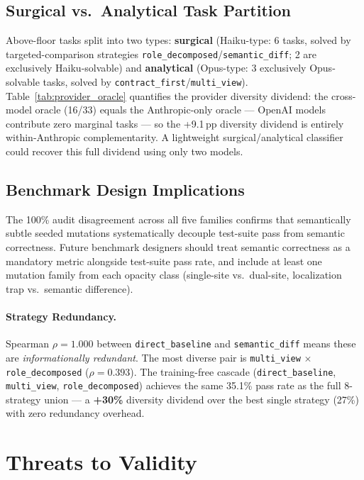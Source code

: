 \documentclass[sigconf,review,anonymous]{acmart}
\newcommand{\pp}{\,pp}
\begin{document}
\subsection{Surgical vs.\ Analytical Task Partition}

Above-floor tasks split into two types: \textbf{surgical} (Haiku-type: 6 tasks, solved by targeted-comparison strategies \texttt{role\_decomposed}/\texttt{semantic\_diff}; 2 are exclusively Haiku-solvable) and \textbf{analytical} (Opus-type: 3 exclusively Opus-solvable tasks, solved by \texttt{contract\_first}/\texttt{multi\_view}). Table~\ref{tab:provider_oracle} quantifies the provider diversity dividend: the cross-model oracle (16/33) equals the Anthropic-only oracle — OpenAI models contribute zero marginal tasks — so the +9.1\pp{} diversity dividend is entirely within-Anthropic complementarity. A lightweight surgical/analytical classifier could recover this full dividend using only two models.

\subsection{Benchmark Design Implications}

The 100\% audit disagreement across all five families confirms that semantically subtle seeded mutations systematically decouple test-suite pass from semantic correctness. Future benchmark designers should treat semantic correctness as a mandatory metric alongside test-suite pass rate, and include at least one mutation family from each opacity class (single-site vs.\ dual-site, localization trap vs.\ semantic difference).

\paragraph{Strategy Redundancy.}
Spearman $\rho = 1.000$ between \texttt{direct\_baseline} and \texttt{semantic\_diff} means these are \emph{informationally redundant}. The most diverse pair is \texttt{multi\_view} $\times$ \texttt{role\_decomposed} ($\rho = 0.393$). The training-free cascade (\texttt{direct\_baseline}, \texttt{multi\_view}, \texttt{role\_decomposed}) achieves the same 35.1\% pass rate as the full 8-strategy union — a \textbf{+30\%} diversity dividend over the best single strategy (27\%) with zero redundancy overhead.

\section{Threats to Validity}
\end{document}

